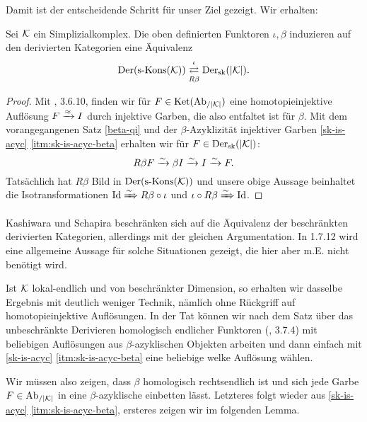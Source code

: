 Damit ist der entscheidende Schritt für unser Ziel gezeigt. Wir
erhalten:

\begin{theorem} \label{dersk-eq}
  Sei $\mathcal{K}$ ein Simplizialkomplex. Die oben definierten Funktoren
  $\iota, \beta$ induzieren auf den derivierten Kategorien eine
  Äquivalenz
  \[ \operatorname{Der}(\operatorname{s-Kons}(\mathcal{K}))
  \mathrel{\mathop{\rightleftarrows}^{\iota}_{R \beta}}
  \operatorname{Der}_{\mathrm{sk}}(|\mathcal{K}|). \]
\end{theorem}
\begin{proof}

  Mit \cite{TD}, 3.6.10, finden wir für $F \in \operatorname{Ket}(\operatorname{Ab}_{/|\mathcal{K}|})$ eine
  homotopieinjektive Auflösung $F \xrightarrow{\approx} I$ durch injektive Garben, die
  also entfaltet ist für $\beta$. Mit dem vorangegangenen Satz
  \ref{beta-qi} und der $\beta$-Azyklizität injektiver Garben
  \ref{sk-is-acyc} \ref{itm:sk-is-acyc-beta} erhalten wir für $F \in
  \operatorname{Der}_{\mathrm{sk}}(|\mathcal{K}|)$:
  \[R \beta F \xrightarrow[]{\sim} \beta I \xrightarrow[]{\sim} I \xrightarrow[]{\sim} F. \]
  Tatsächlich hat $R \beta$ Bild in $\operatorname{Der}(\operatorname{s-Kons}(\mathcal{K}))$ und unsere
  obige Aussage beinhaltet die Isotransformationen $\operatorname{Id} \xRightarrow{\sim} R
  \beta \circ \iota$ und $\iota \circ R \beta \xRightarrow{\sim} \operatorname{Id}$.
\end{proof}
\begin{bem}
  Kashiwara und Schapira beschränken sich auf die Äquivalenz der
  beschränkten derivierten Kategorien, allerdings mit der gleichen
  Argumentation. In \cite{KS} 1.7.12 wird eine allgemeine Aussage für
  solche Situationen gezeigt, die hier aber m.E. nicht benötigt wird.
\end{bem}
\begin{bem}
  Ist $\mathcal{K}$ lokal-endlich und von beschränkter Dimension, so erhalten
  wir dasselbe Ergebnis mit deutlich weniger Technik, nämlich ohne
  Rückgriff auf homotopieinjektive Auflösungen. In der Tat können wir
  nach dem Satz über das unbeschränkte Derivieren homologisch
  endlicher Funktoren (\cite{TG}, 3.7.4) mit beliebigen Auflösungen
  aus $\beta$-azyklischen Objekten arbeiten und dann einfach mit
  \ref{sk-is-acyc} \ref{itm:sk-is-acyc-beta} eine beliebige welke
  Auflösung wählen.

  Wir müssen also zeigen, dass $\beta$ homologisch rechtsendlich ist
  und sich jede Garbe $F \in \operatorname{Ab}_{/|\mathcal{K}|}$ in eine $\beta$-azyklische
  einbetten lässt. Letzteres folgt wieder aus \ref{sk-is-acyc}
  \ref{itm:sk-is-acyc-beta}, ersteres zeigen wir im folgenden Lemma.


\end{bem}
